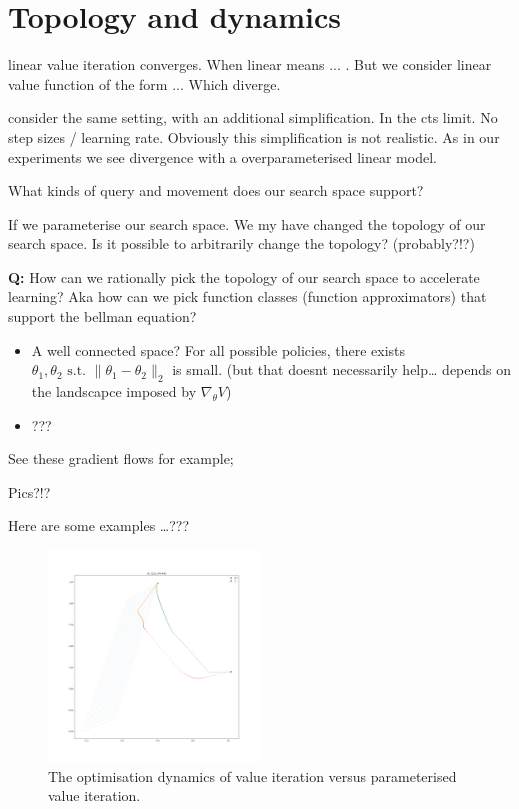 \section{Topology and dynamics}

\cite{Tsitsiklis2000} linear value iteration converges. When linear means ... . But we consider linear value function of the form ...
Which diverge.

\cite{Brandfonbrener2019} consider the same setting, with an additional simplification. In the cts limit. No step sizes / learning rate.
Obviously this simplification is not realistic. As in our experiments we see divergence with a overparameterised linear model.

What kinds of query and movement does our search space support?

If we parameterise our search space. We my have changed the topology of our search space.
Is it possible to arbitrarily change the topology? (probably?!?)

\textbf{Q:} How can we rationally pick the topology of our search space
to accelerate learning?
Aka how can we pick function classes (function approximators) that support the bellman equation?

\begin{itemize}
\item
  A well connected space? For all possible policies, there exists
  \(\theta_1, \theta_2 \text{ s.t. } \parallel \theta_1- \theta_2\parallel_2\)
  is small. (but that doesnt necessarily help\ldots{} depends on the
  landscapce imposed by \(\nabla_{\theta} V\))
\item
  ???
\end{itemize}

See these gradient flows for example;

Pics?!?

Here are some examples \ldots{}???

\begin{figure}
\centering
\includegraphics[width=0.5\textwidth,height=0.5\textheight]{../../pictures/figures/vi-vs-pvi.png}
\caption{The optimisation dynamics of value iteration versus parameterised value iteration.}
\end{figure}

